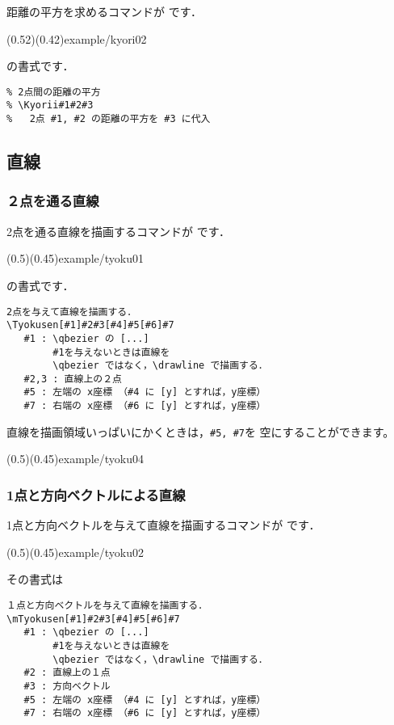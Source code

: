 距離の平方を求めるコマンドが  です．

    (0.52)(0.42){example/kyori02}\bigskip

 の書式です．

\begin{boxnote}
\begin{verbatim}
% 2点間の距離の平方
% \Kyorii#1#2#3
%   2点 #1, #2 の距離の平方を #3 に代入
\end{verbatim}
\end{boxnote}\bigskip


\subsection{直線}
\subsubsection{２点を通る直線}
2点を通る直線を描画するコマンドが  です．

\showexample[2点を通る直線](0.5)(0.45){example/tyoku01}

の書式です．

\begin{boxnote}
\begin{verbatim}
2点を与えて直線を描画する．
\Tyokusen[#1]#2#3[#4]#5[#6]#7
   #1 : \qbezier の [...]
        #1を与えないときは直線を
        \qbezier ではなく，\drawline で描画する．
   #2,3 : 直線上の２点
   #5 : 左端の x座標 （#4 に [y] とすれば，y座標）
   #7 : 右端の x座標 （#6 に [y] とすれば，y座標）
\end{verbatim}
\end{boxnote}

直線を描画領域いっぱいにかくときは，\verb/#5, #7/を
空にすることができます。

\showexample[2点を通る直線](0.5)(0.45){example/tyoku04}

\subsubsection{1点と方向ベクトルによる直線}
1点と方向ベクトルを与えて直線を描画するコマンドが
 です．

\showexample[1点と方向ベクトルを指定](0.5)(0.45){example/tyoku02}

その書式は
\begin{boxnote}
\begin{verbatim}
１点と方向ベクトルを与えて直線を描画する．
\mTyokusen[#1]#2#3[#4]#5[#6]#7
   #1 : \qbezier の [...]
        #1を与えないときは直線を
        \qbezier ではなく，\drawline で描画する．
   #2 : 直線上の１点
   #3 : 方向ベクトル
   #5 : 左端の x座標 （#4 に [y] とすれば，y座標）
   #7 : 右端の x座標 （#6 に [y] とすれば，y座標）
\end{verbatim}
\end{boxnote}

